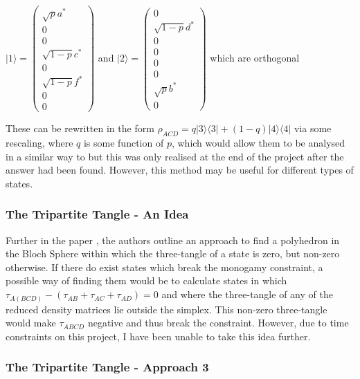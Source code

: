 \documentclass[12pt,a4paper]{article}
\numberwithin{equation}{section}
\begin{document}
\vskip 2mm

$|1\rangle = \begin{pmatrix} \sqrt{p}a^* \\ 0 \\ 0 \\ \sqrt{1-p}c^* \\ 0 \\ \sqrt{1-p}f^* \\ 0 \\ 0 \end{pmatrix}$ and $|2\rangle = \begin{pmatrix} 0 \\ \sqrt{1-p}d^* \\ 0 \\ 0 \\ 0 \\ 0 \\ \sqrt{p}b^* \\ 0 \end{pmatrix}$ which are orthogonal

\vskip 2mm

These can be rewritten in the form $\rho_{ACD} = q|3\rangle\langle3| + (1-q)|4\rangle\langle4|$ via some rescaling, where $q$ is some function of $p$, which would allow them to be analysed in a similar way to \cite{LOSU} but this was only realised at the end of the project after the answer had been found. However, this method may be useful for different types of states.

\newpage

\subsubsection{The Tripartite Tangle - An Idea}
\label{subsubsec:fourTripartiteIdea}

Further in the paper \cite{LOSU}, the authors outline an approach to find a polyhedron in the Bloch Sphere within which the three-tangle of a state is zero, but non-zero otherwise. If there do exist states which break the monogamy constraint, a possible way of finding them would be to calculate states in which $\tau_{A(BCD)} - (\tau_{AB} + \tau_{AC} + \tau_{AD}) = 0$ and where the three-tangle of any of the reduced density matrices lie outside the simplex. This non-zero three-tangle would make $\tau_{ABCD}$ negative and thus break the constraint. However, due to time constraints on this project, I have been unable to take this idea further.


\subsubsection{The Tripartite Tangle - Approach 3}
\label{subsubsec:fourTripartite3}
\end{document}
